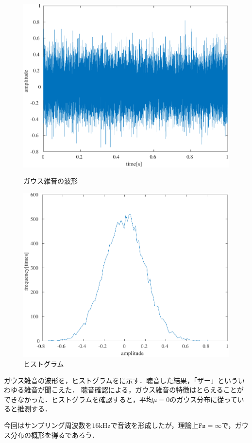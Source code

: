 \begin{figure}
    \centering
    \includegraphics[keepaspectratio,width=.2\textwidth]{../../Figures/01_05_0.pdf}
    \caption{ガウス雑音の波形}
    \label{fig:ガウス雑音の波形}
    \includegraphics[keepaspectratio,width=.2\textwidth]{../../Figures/01_05_1.pdf}
    \caption{ヒストグラム}
    \label{fig:ヒストグラム}
\end{figure}
\result
ガウス雑音の波形を，ヒストグラムをに示す．聴音した結果，「ザー」といういわゆる雑音が聞こえた．
\consideration
聴音確認による，ガウス雑音の特徴はとらえることができなかった．ヒストグラムを確認すると，平均\(\mu=0\)のガウス分布に従っていると推測する．\par
今回はサンプリング周波数を\(16\textrm{kHz}\)で音波を形成したが，理論上\(\texttt{Fs}=\infty\)で，ガウス分布の概形を得るであろう．